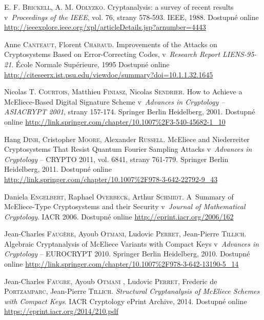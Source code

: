 \documentclass[thesis=M,czech,hidelinks]{FITthesis}[2012/06/26]
\newcommand{\0}{{\textcolor[gray]{0.80}{0}}}
\begin{document}
\begin{thebibliography}{99}
        E. F. \textsc{Brickell}, A. M. \textsc{Odlyzko}. Cryptanalysis: a survey
        of recent results v~\emph{Proceedings of the IEEE}, vol. 76, strany
        578-593. IEEE, 1988. Dostupné online
        \url{http://ieeexplore.ieee.org/xpl/articleDetails.jsp?arnumber=4443}

        Anne \textsc{Canteaut}, Florent \textsc{Chabaud}. Improvements of
        the Attacks on Cryptosystems Based on Error-Correcting Codes,
        v~\emph{Research Report LIENS-95-21}. École Normale Supérieure, 1995
        Dostupné online
        \url{http://citeseerx.ist.psu.edu/viewdoc/summary?doi=10.1.1.32.1645}

        Nicolas T. \textsc{Courtois}, Matthieu \textsc{Finiasz}, Nicolas
        \textsc{Sendrier}. How to Achieve a McEliece-Based Digital Signature
        Scheme v~\emph{Advances in Cryptology -- ASIACRYPT 2001}, strany
        157-174. Springer Berlin Heidelberg, 2001. Dostupné online
        \url{http://link.springer.com/chapter/10.1007\%2F3-540-45682-1\_10}

        Hang \textsc{Dinh}, Cristopher \textsc{Moore}, Alexander
        \textsc{Russell}. McEliece and Niederreiter Cryptosystems That Resist
        Quantum Fourier Sampling Attacks v~\emph{Advances in Cryptology} --
        CRYPTO 2011, vol. 6841, strany 761-779. Springer Berlin Heidelberg,
        2011. Dostupné online
        \url{http://link.springer.com/chapter/10.1007\%2F978-3-642-22792-9\_43}

        Daniela \textsc{Engelbert}, Raphael \textsc{Overbeck}, Arthur
        \textsc{Schmidt}. A~Summary of McEliece-Type Cryptosystems and their
        Security v~\emph{Journal of Mathematical Cryptology}. IACR 2006.
        Dostupné online \url{http://eprint.iacr.org/2006/162}

        Jean-Charles \textsc{Faugère}, Ayoub \textsc{Otmani}, Ludovic
        \textsc{Perret}, Jean-Pierre \textsc{Tillich}. Algebraic Cryptanalysis
        of McEliece Variants with Compact Keys v~\emph{Advances in Cryptology}
        -- EUROCRYPT 2010. Springer Berlin Heidelberg, 2010. Dostupné online
        \url{http://link.springer.com/chapter/10.1007\%2F978-3-642-13190-5\_14}

        Jean-Charles \textsc{Faugre}, Ayoub \textsc{Otmani} , Ludovic
        \textsc{Perret}, Frederic de \textsc{Portzamparc}, Jean-Pierre
        \textsc{Tillich}. \emph{Structural Cryptanalysis of McEliece Schemes
        with Compact Keys}. IACR Cryptology ePrint Archive, 2014. Dostupné
        online \url{https://eprint.iacr.org/2014/210.pdf}


\end{thebibliography}
\end{document}

